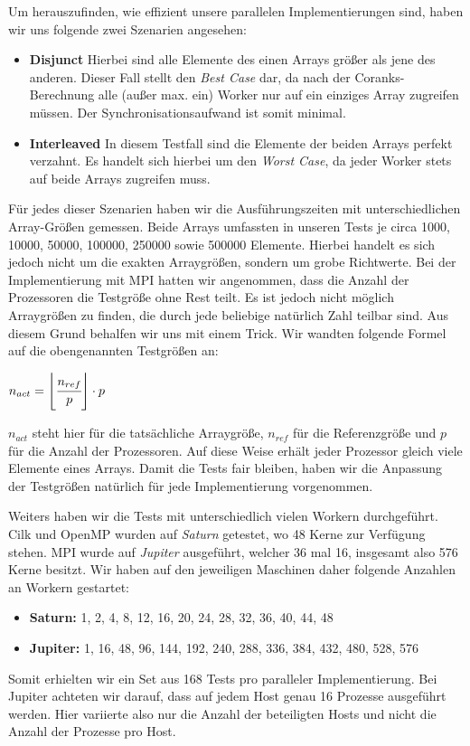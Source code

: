 Um herauszufinden, wie effizient unsere parallelen Implementierungen sind, haben wir uns folgende zwei Szenarien angesehen:
\begin{itemize}
	\item \textbf{Disjunct}\quad
		Hierbei sind alle Elemente des einen Arrays größer als jene des anderen.
		Dieser Fall stellt den \emph{Best Case} dar, da nach der Coranks-Berechnung alle (außer max. ein) Worker nur auf ein einziges Array zugreifen müssen.
		Der Synchronisationsaufwand ist somit minimal.
		
	\item \textbf{Interleaved}\quad
		In diesem Testfall sind die Elemente der beiden Arrays perfekt verzahnt.
		Es handelt sich hierbei um den \emph{Worst Case}, da jeder Worker stets auf beide Arrays zugreifen muss.
\end{itemize}

Für jedes dieser Szenarien haben wir die Ausführungszeiten mit unterschiedlichen Array-Größen gemessen.
Beide Arrays umfassten in unseren Tests je circa 1000, 10000, 50000, 100000, 250000 sowie 500000 Elemente.
Hierbei handelt es sich jedoch nicht um die exakten Arraygrößen, sondern um grobe Richtwerte.
Bei der Implementierung mit MPI hatten wir angenommen, dass die Anzahl der Prozessoren die Testgröße ohne Rest teilt.
Es ist jedoch nicht möglich Arraygrößen zu finden, die durch jede beliebige natürlich Zahl teilbar sind.
Aus diesem Grund behalfen wir uns mit einem Trick.
Wir wandten folgende Formel auf die obengenannten Testgrößen an:
\begin{center}
	$n_{act} = \left \lfloor{\cfrac{n_{ref}}{p}}\right \rfloor \cdot p$
\end{center}

$n_{act}$ steht hier für die tatsächliche Arraygröße, $n_{ref}$ für die Referenzgröße und $p$ für die Anzahl der Prozessoren.
Auf diese Weise erhält jeder Prozessor gleich viele Elemente eines Arrays.
Damit die Tests fair bleiben, haben wir die Anpassung der Testgrößen natürlich für jede Implementierung vorgenommen.
 
Weiters haben wir die Tests mit unterschiedlich vielen Workern durchgeführt.
Cilk und OpenMP wurden auf \emph{Saturn} getestet, wo 48 Kerne zur Verfügung stehen.
MPI wurde auf \emph{Jupiter} ausgeführt, welcher 36 mal 16, insgesamt also 576 Kerne besitzt.
Wir haben auf den jeweiligen Maschinen daher folgende Anzahlen an Workern gestartet:
\begin{itemize}
	\item \textbf{Saturn:} 1, 2, 4, 8, 12, 16, 20, 24, 28, 32, 36, 40, 44, 48
	\item \textbf{Jupiter:} 1, 16, 48, 96, 144, 192, 240, 288, 336, 384, 432, 480, 528, 576
\end{itemize}
 
Somit erhielten wir ein Set aus 168 Tests pro paralleler Implementierung.
Bei Jupiter achteten wir darauf, dass auf jedem Host genau 16 Prozesse ausgeführt werden.
Hier variierte also nur die Anzahl der beteiligten Hosts und nicht die Anzahl der Prozesse pro Host. 